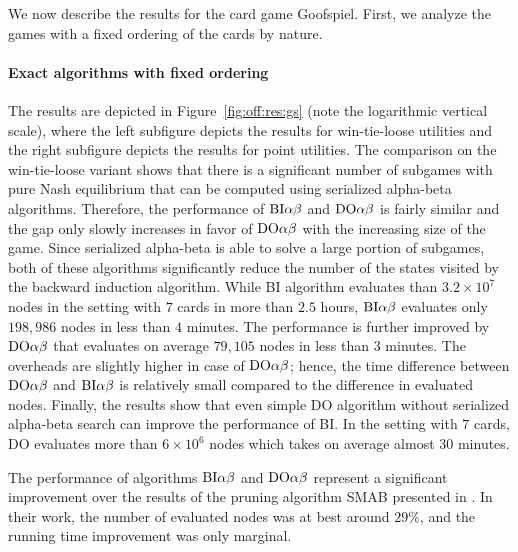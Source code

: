 We now describe the results for the card game Goofspiel.
First, we analyze the games with a fixed ordering of the cards by nature.

\paragraph{Exact algorithms with fixed ordering}
The results are depicted in Figure~\ref{fig:off:res:gs} (note the logarithmic vertical scale), where the left subfigure depicts the results for win-tie-loose utilities and the right subfigure depicts the results for point utilities.
The comparison on the win-tie-loose variant shows that there is a significant number of subgames with pure Nash equilibrium that can be computed using serialized alpha-beta algorithms.
Therefore, the performance of $\textrm{BI}\alpha\beta$ and $\textrm{DO}\alpha\beta$ is fairly similar and the gap only slowly increases in favor of $\textrm{DO}\alpha\beta$ with the increasing size of the game.
Since serialized alpha-beta is able to solve a large portion of subgames, both of these algorithms significantly reduce the number of the states visited by the backward induction algorithm.
While \textsc{BI} algorithm evaluates than $3.2\times10^7$ nodes in the setting with $7$ cards in more than $2.5$ hours, $\textrm{BI}\alpha\beta$ evaluates only $198,986$ nodes in less than $4$ minutes.
The performance is further improved by $\textrm{DO}\alpha\beta$ that evaluates on average $79,105$ nodes in less than $3$ minutes.
The overheads are slightly higher in case of $\textrm{DO}\alpha\beta$; hence, the time difference between $\textrm{DO}\alpha\beta$ and $\textrm{BI}\alpha\beta$ is relatively small compared to the difference in evaluated nodes.
Finally, the results show that even simple \textsc{DO} algorithm without serialized alpha-beta search can improve the performance of \textsc{BI}.
In the setting with $7$ cards, \textsc{DO} evaluates more than $6\times10^6$ nodes which takes on average almost 30 minutes.


The performance of algorithms $\textrm{BI}\alpha\beta$ and $\textrm{DO}\alpha\beta$ represent a significant improvement over the results of the pruning algorithm
SMAB presented in \cite{Saffidine12SMAB}.
In their work, the number of evaluated nodes was at best around $29\%$, and the running time improvement was only marginal.

